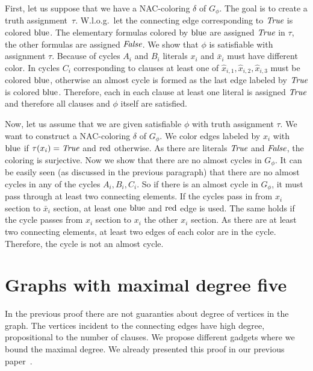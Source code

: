 First, let us suppose that we have a NAC-coloring \( \delta \) of \( G_\phi \).
The goal is to create a truth assignment~\( \tau \).
W.l.o.g.\ let the connecting edge corresponding to \( \textit{True} \) is colored \( \text{blue} \).
The elementary formulas colored by \( \text{blue} \) are assigned \( \textit{True} \) in \( \tau \),
the other formulas are assigned \( \textit{False} \).
We show that \( \phi \) is satisfiable with assignment \( \tau \).
Because of cycles \( A_i \) and \( B_i \) literals \( x_i \) and \( \bar{x}_i \)
must have different color. In cycles \( C_i \) corresponding to clauses
at least one of \( \hat{x}_{i,1}, \hat{x}_{i,2}, \hat{x}_{i,3} \) must be colored \( \text{blue} \),
otherwise an almost cycle is formed as the last edge labeled by \( \textit{True} \) is colored \( \text{blue} \).
Therefore, each in each clause at least one literal is assigned \( \textit{True} \)
and therefore all clauses and \( \phi \) itself are satisfied.

Now, let us assume that we are given satisfiable \( \phi \)
with truth assignment \( \tau \).
We want to construct a NAC-coloring \( \delta \) of \( G_\phi \).
We color edges labeled by \( x_i \) with \( \text{blue} \) if \( \tau(x_i) = \textit{True} \)
and \( \text{red} \) otherwise.
As there are literals \( \textit{True} \) and \( \textit{False} \), the coloring is surjective.
Now we show that there are no almost cycles in \( G_\phi \).
It can be easily seen (as discussed in the previous paragraph)
that there are no almost cycles in any of the cycles \( A_i, B_i, C_i \).
So if there is an almost cycle in \( G_\phi \), it must pass through
at least two connecting elements.
If the cycles pass in 
from \( x_i \) section to \( \bar{x}_i \) section, at least one \( \text{blue} \)
and \( \text{red} \) edge is used. The same holds if the cycle passes
from \( x_i \) section to \( x_i \) the other \( x_i \) section.
As there are at least two connecting elements, at least two edges of each color are in the cycle.
Therefore, the cycle is not an almost cycle.



\section{Graphs with maximal degree five}

In the previous proof there are not guaranties about
degree of vertices in the graph. The vertices incident to the connecting edges
have high degree, propositional to the number of clauses.
We propose different gadgets where we bound the maximal degree.
We already presented this proof in our previous paper~\cite{my_paper}.

